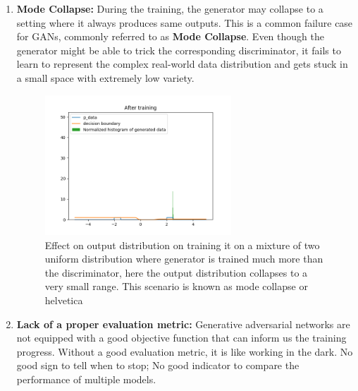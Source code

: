 \documentclass{article}
\begin{document}
\begin{enumerate}
\begin{figure}[h!]
        \label{fig:0}
    \end{figure}
    \item \textbf{Mode Collapse:} During the training, the generator may collapse to a setting where it always produces same outputs. This is a common failure case for GANs, commonly referred to as \textbf{Mode Collapse}. Even though the generator might be able to trick the corresponding discriminator, it fails to learn to represent the complex real-world data distribution and gets stuck in a small space with extremely low variety.
    \begin{figure}[h!]
        \includegraphics[width=7cm]{helevetica.png}
        \caption{Effect on output distribution on training it on a mixture of two uniform distribution where generator is trained much more than the discriminator, here the output distribution collapses to a very small range. This scenario is known as mode collapse or helvetica }
        \label{fig:2}
    \end{figure}
    \item \textbf{Lack of a proper evaluation metric:} Generative adversarial networks are not equipped with a good objective function that can inform us the training progress. Without a good evaluation metric, it is like working in the dark. No good sign to tell when to stop; No good indicator to compare the performance of multiple models.
\end{enumerate}
\end{document}
